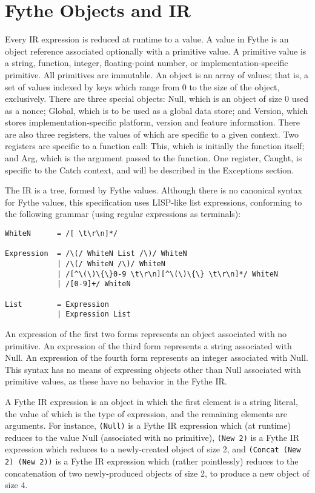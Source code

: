 \chapter{Fythe Objects and IR}\label{chap:ir}

Every IR expression is reduced at runtime to a value. A value in Fythe is an
object reference associated optionally with a primitive value. A primitive
value is a string, function, integer, floating-point number, or
implementation-specific primitive. All primitives are immutable. An object is
an array of values; that is, a set of values indexed by keys which range from 0
to the size of the object, exclusively. There are three special objects: Null,
which is an object of size 0 used as a nonce; Global, which is to be used as a
global data store; and Version, which stores implementation-specific platform,
version and feature information. There are also three registers, the values of
which are specific to a given context. Two registers are specific to a function
call: This, which is initially the function itself; and Arg, which is the
argument passed to the function. One register, Caught, is specific to the Catch
context, and will be described in the Exceptions section. %

The IR is a tree, formed by Fythe values. Although there is no canonical syntax
for Fythe values, this specification uses LISP-like list expressions,
conforming to the following grammar (using regular expressions as terminals):

\begin{verbatim}
WhiteN      = /[ \t\r\n]*/

Expression  = /\(/ WhiteN List /\)/ WhiteN
            | /\(/ WhiteN /\)/ WhiteN
            | /[^\(\)\{\}0-9 \t\r\n][^\(\)\{\} \t\r\n]*/ WhiteN
            | /[0-9]+/ WhiteN

List        = Expression
            | Expression List
\end{verbatim}

An expression of the first two forms represents an object associated with no
primitive. An expression of the third form represents a string associated with
Null. An expression of the fourth form represents an integer associated with
Null. This syntax has no means of expressing objects other than Null associated
with primitive values, as these have no behavior in the Fythe IR.

A Fythe IR expression is an object in which the first element is a string
literal, the value of which is the type of expression, and the remaining
elements are arguments. For instance,
\texttt{(Null)}
is a Fythe IR expression which (at runtime) reduces to the value Null
(associated with no primitive),
\texttt{(New 2)}
is a Fythe IR expression which reduces to a newly-created object of size 2, and
\texttt{(Concat (New 2) (New 2))}
is a Fythe IR expression which (rather pointlessly) reduces to the
concatenation of two newly-produced objects of size 2, to produce a new object
of size 4.

